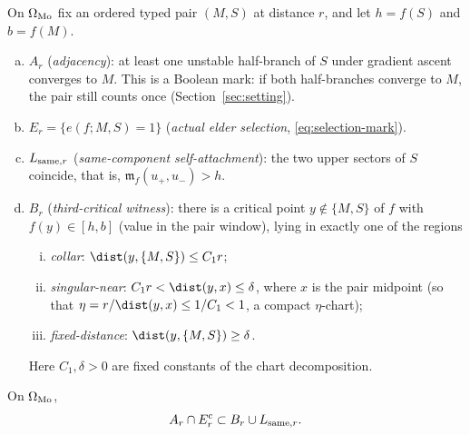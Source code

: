 \begin{definition}\label{def:selection-events}
On $\Omega_{\rm Mo}$ fix an ordered typed pair $(M,S)$ at distance $r$, and let $h=f(S)$ and $b=f(M)$.
\begin{enumerate}[(a)]
\item $A_r$ (\emph{adjacency}): at least one unstable half-branch of $S$ under gradient ascent converges to $M$. This is a Boolean mark: if both half-branches converge to $M$, the pair still counts once (Section~\ref{sec:setting}).
\item $E_r=\{e(f;M,S)=1\}$ (\emph{actual elder selection}, \eqref{eq:selection-mark}).
\item $L_{{\rm same},r}$ (\emph{same-component self-attachment}): the two upper sectors of $S$ coincide, that is, $\mathfrak m_f(u_+,u_-)>h$.
\item $B_r$ (\emph{third-critical witness}): there is a critical point $y\notin\{M,S\}$ of $f$ with $f(y)\in[h,b]$ (value in the pair window), lying in exactly one of the regions
\begin{enumerate}[(i)]
\item \emph{collar}: $\dist(y,\{M,S\})\le C_1r$;
\item \emph{singular-near}: $C_1r<\dist(y,x)\le\delta$, where $x$ is the pair midpoint (so that $\eta=r/\dist(y,x)\le1/C_1<1$, a compact $\eta$-chart);
\item \emph{fixed-distance}: $\dist(y,\{M,S\})\ge\delta$.
\end{enumerate}
Here $C_1,\delta>0$ are fixed constants of the chart decomposition.
\end{enumerate}
\end{definition}

\begin{lemma}\label{lem:selection-trichotomy}
On $\Omega_{\rm Mo}$,
\begin{equation}\label{eq:selection-trichotomy}
A_r\cap E_r^c\subset B_r\cup L_{{\rm same},r}.
\end{equation}
\end{lemma}


